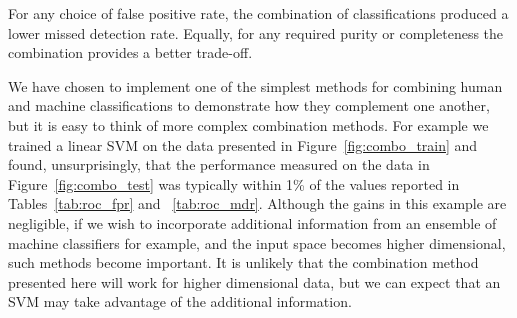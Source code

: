 \documentclass[a4paper,fleqn,usenatbib]{mnras}
\begin{document}


For any choice of false positive rate, the combination of classifications produced a lower missed detection rate. Equally, for any required purity or completeness the combination provides a better trade-off. 

We have chosen to implement one of the simplest methods for combining human and machine classifications to demonstrate how they complement one another, but it is easy to think of more complex combination methods. For example we trained a linear SVM on the data presented in Figure~\ref{fig:combo_train} and found, unsurprisingly, that the performance measured on the data in Figure~\ref{fig:combo_test} was typically within 1\% of the values reported in Tables~\ref{tab:roc_fpr} and ~\ref{tab:roc_mdr}.  Although the gains in this example are negligible, if we wish to incorporate additional information from an ensemble of machine classifiers for example, and the input space becomes higher dimensional, such methods become important.  It is unlikely that the combination method presented here will work for higher dimensional data, but we can expect that an SVM may take advantage of the additional information.
\end{document}
